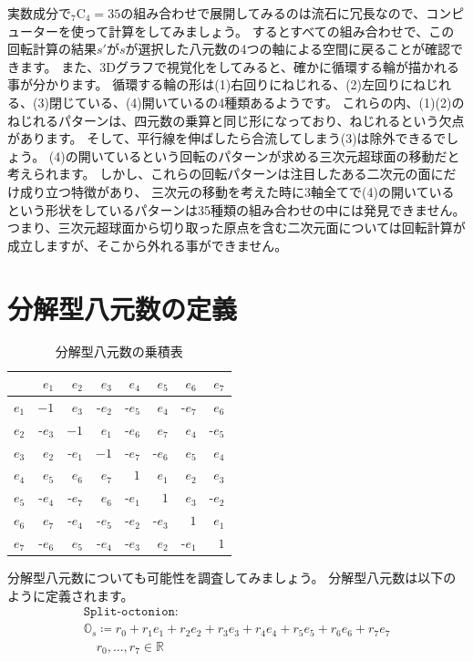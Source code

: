 \documentclass[a4paper,12pt,notitlepage]{jsreport}
\begin{document}
実数成分で${}_7 \mathrm{C}_4=35$の組み合わせで展開してみるのは流石に冗長なので、コンピューターを使って計算をしてみましょう。
するとすべての組み合わせで、この回転計算の結果$s'$が$s$が選択した八元数の4つの軸による空間に戻ることが確認できます。
また、3Dグラフで視覚化をしてみると、確かに循環する輪が描かれる事が分かります。
循環する輪の形は(1)右回りにねじれる、(2)左回りにねじれる、(3)閉じている、(4)開いているの4種類あるようです。
これらの内、(1)(2)のねじれるパターンは、四元数の乗算と同じ形になっており、ねじれるという欠点があります。
そして、平行線を伸ばしたら合流してしまう(3)は除外できるでしょう。
(4)の開いているという回転のパターンが求める三次元超球面の移動だと考えられます。
しかし、これらの回転パターンは注目したある二次元の面にだけ成り立つ特徴があり、
三次元の移動を考えた時に3軸全てで(4)の開いているという形状をしているパターンは35種類の組み合わせの中には発見できません。
つまり、三次元超球面から切り取った原点を含む二次元面については回転計算が成立しますが、そこから外れる事ができません。

\section{分解型八元数の定義}

\begin{table}
  \caption{分解型八元数の乗積表\label{split-octonion-multiplication-table}}
  \centering
  \begin{tabular}{rrrrrrrr}\hline
        & $e_1$& $e_2$& $e_3$& $e_4$& $e_5$& $e_6$& $e_7$\\\hline
    $e_1$& $ -1$& $e_3$&-$e_2$&-$e_5$& $e_4$&-$e_7$& $e_6$\\\hline
    $e_2$&-$e_3$& $ -1$& $e_1$&-$e_6$& $e_7$& $e_4$&-$e_5$\\\hline
    $e_3$& $e_2$&-$e_1$& $ -1$&-$e_7$&-$e_6$& $e_5$& $e_4$\\\hline
    $e_4$& $e_5$& $e_6$& $e_7$& $  1$& $e_1$& $e_2$& $e_3$\\\hline
    $e_5$&-$e_4$&-$e_7$& $e_6$&-$e_1$& $  1$& $e_3$&-$e_2$\\\hline
    $e_6$& $e_7$&-$e_4$&-$e_5$&-$e_2$&-$e_3$& $  1$& $e_1$\\\hline
    $e_7$&-$e_6$& $e_5$&-$e_4$&-$e_3$& $e_2$&-$e_1$& $  1$\\\hline
  \end{tabular}
\end{table}

分解型八元数についても可能性を調査してみましょう。
分解型八元数は以下のように定義されます。
\begin{multline}
  \texttt{Split-octonion}:\\
  \mathbb{O}_s\coloneq r_0+r_1e_1+r_2e_2+r_3e_3+r_4e_4+r_5e_5+r_6e_6+r_7e_7\\
  \quad r_0,...,r_7\in\mathbb{R}
\end{multline}
\end{document}
